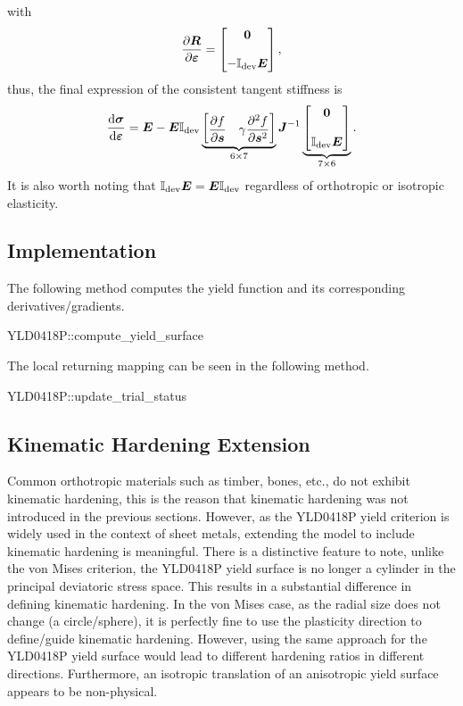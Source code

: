     with
    \begin{gather}
        \dfrac{\partial{\bm{R}}}{\partial{\bm{\varepsilon}}}=\begin{bmatrix}
            \bm{0} \\[4mm]
            -\mathbb{I}_\text{dev}\bm{E}
        \end{bmatrix},
    \end{gather}
    thus, the final expression of the consistent tangent stiffness is
    \begin{gather}
    \dfrac{\mathrm{d}\bm{\sigma}}{\mathrm{d}\bm{\varepsilon}}=\bm{E}-\bm{E}\mathbb{I}_\text{dev}\underbrace{\begin{bmatrix}
            \dfrac{\partial{f}}{\partial{\bm{s}}} & \gamma\dfrac{\partial{^2f}}{\partial{\bm{s}^2}}
        \end{bmatrix}}_{6\times7}\bm{J}^{-1}\underbrace{\begin{bmatrix}
            \bm{0} \\[4mm]
            \mathbb{I}_\text{dev}\bm{E}
        \end{bmatrix}}_{7\times6}.
\end{gather}
It is also worth noting that $\mathbb{I}_\text{dev}\bm{E}=\bm{E}\mathbb{I}_\text{dev}$ regardless of orthotropic or isotropic elasticity.
\subsection{Implementation}
The following method computes the yield function and its corresponding derivatives/gradients.
\begin{cppcode}
YLD0418P::compute_yield_surface
\end{cppcode}

The local returning mapping can be seen in the following method.
\begin{cppcode}
YLD0418P::update_trial_status
\end{cppcode}
\subsection{Kinematic Hardening Extension}
Common orthotropic materials such as timber, bones, etc., do not exhibit kinematic hardening, this is the reason that kinematic hardening was not introduced in the previous sections.
However, as the YLD0418P yield criterion is widely used in the context of sheet metals, extending the model to include kinematic hardening is meaningful.
There is a distinctive feature to note, unlike the von Mises criterion, the YLD0418P yield surface is no longer a cylinder in the principal deviatoric stress space.
This results in a substantial difference in defining kinematic hardening.
In the von Mises case, as the radial size does not change (a circle/sphere), it is perfectly fine to use the plasticity direction to define/guide kinematic hardening.
However, using the same approach for the YLD0418P yield surface would lead to different hardening ratios in different directions.
Furthermore, an isotropic translation of an anisotropic yield surface appears to be non-physical.

